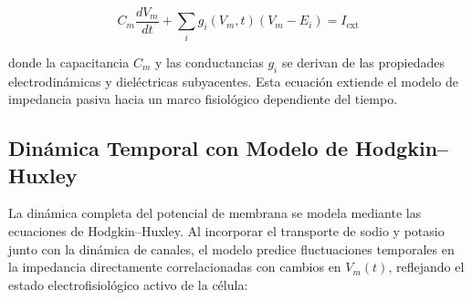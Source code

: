 \documentclass[12pt]{article}
\begin{document}
\begin{equation}
C_m \frac{dV_m}{dt} +
\sum_i g_i(V_m,t)(V_m - E_i)
= I_{\text{ext}}
\end{equation}

donde la capacitancia $C_m$ y las conductancias $g_i$ se derivan de las propiedades
electrodin\'amicas y diel\'ectricas subyacentes. Esta ecuaci\'on extiende el modelo de impedancia
pasiva hacia un marco fisiol\'ogico dependiente del tiempo.

\subsection{Din\'amica Temporal con Modelo de Hodgkin--Huxley}

La din\'amica completa del potencial de membrana se modela mediante las ecuaciones de
Hodgkin--Huxley. Al incorporar el transporte de sodio y potasio junto con la din\'amica de
canales, el modelo predice fluctuaciones temporales en la impedancia directamente
correlacionadas con cambios en $V_m(t)$, reflejando el estado electrofisiol\'ogico activo
de la c\'elula:
\end{document}
